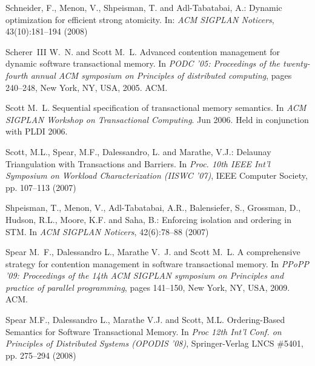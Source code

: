 \begin{thebibliography}{99}
{
 Schneider, F., Menon, V., Shpeisman, T. and Adl-Tabatabai, A.:
 Dynamic optimization for efficient strong atomicity.
In: {\it ACM  SIGPLAN Noticers}, 43(10):181--194  (2008)

Scherer~III W.~N. and Scott M.~L.
\newblock Advanced contention management for dynamic software transactional
  memory.
\newblock In {\em PODC '05: Proceedings of the twenty-fourth annual ACM
  symposium on Principles of distributed computing}, pages 240--248, New York,
  NY, USA, 2005. ACM.




Scott M.~L.
\newblock Sequential specification of transactional memory semantics.
\newblock In {\em ACM SIGPLAN Workshop on Transactional Computing}. Jun 2006.
\newblock Held in conjunction with PLDI 2006.



 Scott, M.L.,  Spear, M.F., Dalessandro, L. and   Marathe, V.J.:
\newblock Delaunay Triangulation with Transactions and Barriers. 
\newblock In {\it Proc.  10th IEEE Int'l Symposium on Workload Characterization (IISWC '07)},
 IEEE Computer Society, pp. 107--113 (2007)



 Shpeisman, T.,  Menon, V.,  Adl-Tabatabai, A.R.,  Balensiefer, S.,  Grossman, D.,
 Hudson, R.L., Moore, K.F. and Saha, B.:
\newblock Enforcing isolation and ordering in STM. 
\newblock In {\it ACM  SIGPLAN Noticers}, 42(6):78--88  (2007)

Spear M.~F., Dalessandro L., Marathe V.~J. and  Scott M.~L.
\newblock A comprehensive strategy for contention management in software
  transactional memory.
\newblock In {\em PPoPP '09: Proceedings of the 14th ACM SIGPLAN symposium on
  Principles and practice of parallel programming}, pages 141--150, New York,
  NY, USA, 2009. ACM.


Spear M.F.,  Dalessandro L.,  Marathe V.J. and  Scott, M.L.
\newblock Ordering-Based Semantics for Software Transactional Memory. 
\newblock In {\it Proc  12th Int'l Conf. on Principles of Distributed Systems 
(OPODIS '08)},  Springer-Verlag LNCS \#5401, pp. 275--294 (2008) 



}
\end{thebibliography}
